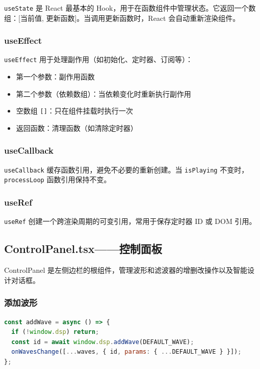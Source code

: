 ﻿\documentclass[12pt,a4paper,oneside]{ctexbook}
\begin{document}
\texttt{useState} 是 React 最基本的 Hook，用于在函数组件中管理状态。它返回一个数组：[当前值, 更新函数]。当调用更新函数时，React 会自动重新渲染组件。

\subsubsection{useEffect}

\texttt{useEffect} 用于处理副作用（如初始化、定时器、订阅等）：
\begin{itemize}
    \item 第一个参数：副作用函数
    \item 第二个参数（依赖数组）：当依赖变化时重新执行副作用
    \item 空数组 \texttt{[]}：只在组件挂载时执行一次
    \item 返回函数：清理函数（如清除定时器）
\end{itemize}

\subsubsection{useCallback}

\texttt{useCallback} 缓存函数引用，避免不必要的重新创建。当 \texttt{isPlaying} 不变时，\texttt{processLoop} 函数引用保持不变。

\subsubsection{useRef}

\texttt{useRef} 创建一个跨渲染周期的可变引用，常用于保存定时器 ID 或 DOM 引用。

\subsection{ControlPanel.tsx——控制面板}

ControlPanel 是左侧边栏的根组件，管理波形和滤波器的增删改操作以及智能设计对话框。

\subsubsection{添加波形}

\begin{lstlisting}[language=JavaScript, caption={添加波形函数}]
const addWave = async () => {
  if (!window.dsp) return;
  const id = await window.dsp.addWave(DEFAULT_WAVE);
  onWavesChange([...waves, { id, params: { ...DEFAULT_WAVE } }]);
};
\end{lstlisting}
\end{document}
